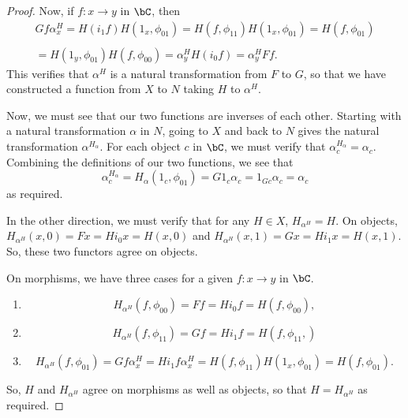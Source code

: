 \documentclass[main.tex]{subfiles}
\begin{document}
\begin{proof}
	Now, if $f:x\rightarrow y$ in $\bC$, then
	\[\begin{array}{l}Gf\alpha^H_x=H(i_1f)H(1_x,\phi_{01})=H(f,\phi_{11})
			H(1_x,\phi_{01})=H(f,\phi_{01})\\
	\\=H(1_y,\phi_{01})H(f,\phi_{00})=\alpha^H_yH(i_0f)=\alpha^H_yFf.
	\end{array}\]
	This verifies that $\alpha^H$ is a natural transformation from $F$ to $G$,
	so that we have constructed a function from $X$ to $N$ taking $H$ to
	$\alpha^H$.

	Now, we must see that our two functions are inverses of each other. Starting
	with a natural transformation $\alpha$ in $N$, going to $X$ and back to $N$
	gives the natural transformation $\alpha^{H_\alpha}$. For each object $c$ in
	$\bC$, we must verify that $\alpha^{H_\alpha}_c=\alpha_c$. Combining the
	definitions of our two functions, we see that
	\[\alpha^{H_\alpha}_c=H_\alpha(1_c,\phi_{01})=G1_c\alpha_c=1_{Gc}\alpha_c=\alpha_c\]
	as required.

	In the other direction, we must verify that for any $H\in X$,
	$H_{\alpha^H}=H$. On objects, $H_{\alpha^H}(x,0)=Fx=Hi_0x=H(x,0)$ and
	$H_{\alpha^H}(x,1)=Gx=Hi_1x=H(x,1)$. So, these two functors agree on
	objects.

	On morphisms, we have three cases for a given $f:x\rightarrow y$ in $\bC$.
	\begin{enumerate}
		\item
			\[H_{\alpha^H}(f,\phi_{00})=Ff=Hi_0f=H(f,\phi_{00}),\]
		\item
			\[H_{\alpha^H}(f,\phi_{11})=Gf=Hi_1f=H(f,\phi_{11},)\]
		\item
			\[H_{\alpha^H}(f,\phi_{01})=Gf\alpha^H_x=Hi_1f\alpha^H_x=H(f,\phi_{11})H(1_x,\phi_{01})=H(f,\phi_{01}).\]
	\end{enumerate}
	So, $H$ and $H_{\alpha^H}$ agree on morphisms as well as objects, so that
	$H=H_{\alpha^H}$ as required.
\end{proof}
\end{document}
